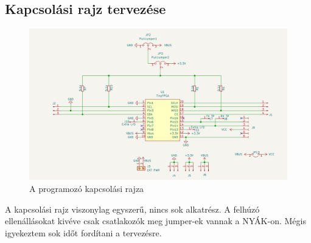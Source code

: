 \documentclass[a4paper,12pt,oneside]{book}
\begin{document}
\subsection{Kapcsolási rajz tervezése}
\begin{figure}[H]
	\centering
	\includegraphics[trim=1mm 1mm 1mm 1mm,scale=0.30]{kapcsolasi rajz.PNG}
	\caption{A programozó kapcsolási rajza}
	\label{teljes kapcsolási rajz}
\end{figure}
A kapcsolási rajz viszonylag egyszerű, nincs sok alkatrész. A felhúzó ellenállásokat kivéve csak csatlakozók meg jumper-ek vannak a NYÁK-on. Mégis igyekeztem sok időt fordítani a tervezésre.
\end{document}
